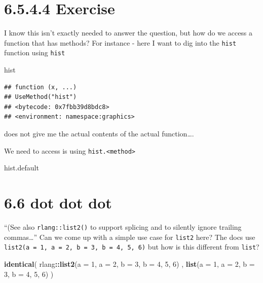 \documentclass[]{book}
\newenvironment{Shaded}{\begin{snugshade}}{\end{snugshade}}
\newcommand{\DataTypeTok}[1]{\textcolor[rgb]{0.13,0.29,0.53}{#1}}
\newcommand{\DecValTok}[1]{\textcolor[rgb]{0.00,0.00,0.81}{#1}}
\newcommand{\KeywordTok}[1]{\textcolor[rgb]{0.13,0.29,0.53}{\textbf{#1}}}
\newcommand{\NormalTok}[1]{#1}
\newcommand{\OperatorTok}[1]{\textcolor[rgb]{0.81,0.36,0.00}{\textbf{#1}}}
\begin{document}
\hypertarget{exercise-3}{%
\section*{6.5.4.4 Exercise}\label{exercise-3}}

I know this isn't exactly needed to answer the question, but how do we access a function that has methods? For instance - here I want to dig into the \texttt{hist} function using \texttt{hist}

\begin{Shaded}
\begin{Highlighting}[]
\NormalTok{hist}
\end{Highlighting}
\end{Shaded}

\begin{verbatim}
## function (x, ...) 
## UseMethod("hist")
## <bytecode: 0x7fbb39d8bdc8>
## <environment: namespace:graphics>
\end{verbatim}

does not give me the actual contents of the actual function\ldots{}.

We need to access is using \texttt{hist.\textless{}method\textgreater{}}

\begin{Shaded}
\begin{Highlighting}[]
\NormalTok{hist.default}
\end{Highlighting}
\end{Shaded}

\hypertarget{dot-dot-dot}{%
\section*{6.6 dot dot dot}\label{dot-dot-dot}}

``(See also \texttt{rlang::list2()} to support splicing and to silently ignore trailing commas\ldots{}'' Can we come up with a simple use case for \texttt{list2} here? The docs use \texttt{list2(a\ =\ 1,\ a\ =\ 2,\ b\ =\ 3,\ b\ =\ 4,\ 5,\ 6)} but how is this different from \texttt{list}?

\begin{Shaded}
\begin{Highlighting}[]
\KeywordTok{identical}\NormalTok{(}
\NormalTok{  rlang}\OperatorTok{::}\KeywordTok{list2}\NormalTok{(}\DataTypeTok{a =} \DecValTok{1}\NormalTok{, }\DataTypeTok{a =} \DecValTok{2}\NormalTok{, }\DataTypeTok{b =} \DecValTok{3}\NormalTok{, }\DataTypeTok{b =} \DecValTok{4}\NormalTok{, }\DecValTok{5}\NormalTok{, }\DecValTok{6}\NormalTok{) ,}
  \KeywordTok{list}\NormalTok{(}\DataTypeTok{a =} \DecValTok{1}\NormalTok{, }\DataTypeTok{a =} \DecValTok{2}\NormalTok{, }\DataTypeTok{b =} \DecValTok{3}\NormalTok{, }\DataTypeTok{b =} \DecValTok{4}\NormalTok{, }\DecValTok{5}\NormalTok{, }\DecValTok{6}\NormalTok{)}
\NormalTok{)}
\end{Highlighting}
\end{Shaded}
\end{document}
